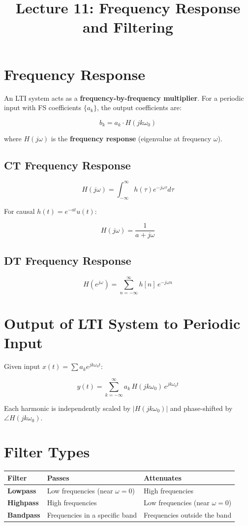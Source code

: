 \documentclass[11pt]{article}
\title{Lecture 11: Frequency Response and Filtering}
\author{}
\date{}
\begin{document}
\maketitle

\section*{Frequency Response}

An LTI system acts as a \textbf{frequency-by-frequency multiplier}. For a periodic input with FS coefficients $\{a_k\}$, the output coefficients are:

\[b_k = a_k \cdot H(jk\omega_0)\]

where $H(j\omega)$ is the \textbf{frequency response} (eigenvalue at frequency $\omega$).

\subsection*{CT Frequency Response}

\[H(j\omega) = \int_{-\infty}^{\infty} h(\tau) e^{-j\omega\tau} d\tau\]

For causal $h(t) = e^{-at}u(t)$:

\[H(j\omega) = \frac{1}{a + j\omega}\]

\subsection*{DT Frequency Response}

\[H(e^{j\omega}) = \sum_{n=-\infty}^{\infty} h[n] \, e^{-j\omega n}\]

\section*{Output of LTI System to Periodic Input}

Given input $x(t) = \sum a_k e^{jk\omega_0 t}$:

\[y(t) = \sum_{k=-\infty}^{\infty} a_k \, H(jk\omega_0) \, e^{jk\omega_0 t}\]

Each harmonic is independently scaled by $|H(jk\omega_0)|$ and phase-shifted by $\angle H(jk\omega_0)$.

\section*{Filter Types}

\begin{center}
\begin{tabular}{|l|l|l|}
\hline
\textbf{Filter} & \textbf{Passes} & \textbf{Attenuates} \\
\hline
\textbf{Lowpass} & Low frequencies (near $\omega = 0$) & High frequencies \\
\hline
\textbf{Highpass} & High frequencies & Low frequencies (near $\omega = 0$) \\
\hline
\textbf{Bandpass} & Frequencies in a specific band & Frequencies outside the band \\
\hline
\end{tabular}
\end{center}
\end{document}
